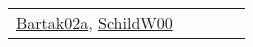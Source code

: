 {\begin{longtable}{lp{3cm}>{\raggedright}p{6cm}>{\raggedright}p{6cm}p{8cm}}
\href{papers/Bartak02a.pdf}{Bartak02a}\cite{Bartak02a}, \href{articles/SchildW00.pdf}{SchildW00}\cite{SchildW00}\\
\end{longtable}
}


